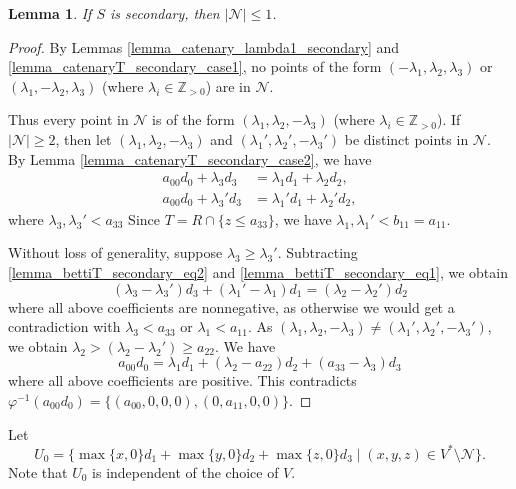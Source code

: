\documentclass[12pt]{article}
\newtheorem{lemma}[thm]{Lemma}
\theoremstyle{remark}
\begin{document}
\begin{lemma}\label{lemma_bettiT_secondary}
     If $S$ is secondary, then $|\mathcal{N}| \leq 1$.
\end{lemma}
\begin{proof} 
By Lemmas \ref{lemma_catenary_lambda1_secondary} and \ref{lemma_catenaryT_secondary_case1}, no points of the form $(-\lambda_1,\lambda_2,\lambda_3)$ or $(\lambda_1,-\lambda_2,\lambda_3)$ (where $\lambda_i \in \mathbb{Z}_{>0}$) are in $\mathcal{N}$.

Thus every point in $\mathcal{N}$ is of the form $(\lambda_1,\lambda_2,-\lambda_3)$ (where $\lambda_i \in \mathbb{Z}_{>0}$). 
If $|\mathcal{N}| \geq 2$, then let $(\lambda_1,\lambda_2,-\lambda_3)$ and $(\lambda_1',\lambda_2',-\lambda_3')$ be distinct points in $\mathcal{N}$. By Lemma \ref{lemma_catenaryT_secondary_case2}, we have
\begin{align}
    a_{00}d_0 + \lambda_3d_3 &=  \lambda_1d_1 + \lambda_2d_2,  \label{lemma_bettiT_secondary_eq1} \\
    a_{00}d_0 + \lambda_3'd_3 &=  \lambda_1'd_1 + \lambda_2'd_2, \label{lemma_bettiT_secondary_eq2}
\end{align}
where $\lambda_3, \lambda_3' < a_{33}$ Since $T = R \cap \{z \leq a_{33}\}$, we have $\lambda_1, \lambda_1' < b_{11}=a_{11}$.  

Without loss of generality, suppose $\lambda_3 \geq \lambda_3'$. Subtracting \eqref{lemma_bettiT_secondary_eq2} and \eqref{lemma_bettiT_secondary_eq1}, we obtain
\begin{equation}
    (\lambda_3- \lambda_3')d_3 + (\lambda_1'-\lambda_1)d_1 =  (\lambda_2-\lambda_2')d_2
\end{equation}
where all above coefficients are nonnegative, as otherwise we would get a contradiction with $\lambda_3 < a_{33}$ or $\lambda_1 < a_{11}$. As $(\lambda_1,\lambda_2,-\lambda_3) \neq (\lambda_1',\lambda_2',-\lambda_3')$, we obtain $\lambda_2 >
(\lambda_2-\lambda_2') \geq a_{22}$. We have 
\begin{equation}
     a_{00}d_0 =  \lambda_1d_1 + (\lambda_2-a_{22})d_2 + (a_{33}-\lambda_3)d_3
\end{equation}
where all above coefficients are positive. This contradicts $\varphi^{-1}(a_{00}d_0) = \{(a_{00},0,0,0), (0,a_{11},0,0)\}$. 
\end{proof}

Let
$$U_0 = \{ \max\{ x,0\} d_1 + \max\{y,0\}d_2 + \max\{z,0\}d_3 \mid (x,y,z) \in V^* \setminus \mathcal{N} \}.$$
Note that $U_0$ is independent of the choice of $V$.
\end{document}
